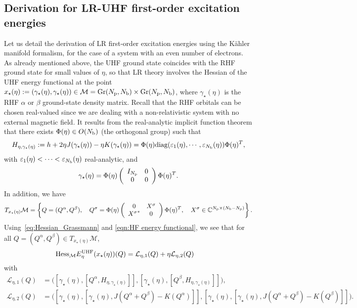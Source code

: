 \documentclass[11pt]{article}
\def\C{{\mathbb C}}
\begin{document}
\subsection{Derivation for LR-UHF first-order excitation energies}

Let us detail the derivation of LR first-order excitation energies using the K\"ahler manifold formalism, for the case of a system with an even number of electrons. As already mentioned above, the UHF ground state coincides with the RHF ground state for small values of $\eta$, so that LR theory involves the Hessian of the UHF energy functional at the point $x_\star(\eta):=(\gamma_\star(\eta),\gamma_\star(\eta)) \in \mathcal M={\rm Gr}(N_{\rm p},N_{\rm b}) \times {\rm Gr}(N_{\rm p},N_{\rm b})$, where $\gamma_\star(\eta)$ is the RHF $\alpha$ or $\beta$ ground-state density matrix. Recall that the RHF orbitals can be chosen real-valued since we are dealing with a non-relativistic system with no external magnetic field. It results from the real-analytic implicit function theorem that there exists $\Phi(\eta) \in  O(N_{\rm b})$ (the orthogonal group) such that 
$$
H_{\eta,\gamma_\star(\eta)} := h+2\eta J(\gamma_\star(\eta)) - \eta K(\gamma_\star(\eta)) = \Phi(\eta) \mbox{diag}(\varepsilon_1(\eta),\cdots,\varepsilon_{N_{\rm b}}(\eta)) \Phi(\eta)^T,
$$
with $\varepsilon_1(\eta) < \cdots < \varepsilon_{N_{\rm b}}(\eta)$ real-analytic, and
$$
\gamma_\star(\eta) = \Phi(\eta) \left( \begin{array}{cc} I_{N_{\rm p}} & 0 \\ 0 & 0 \end{array} \right) \Phi(\eta)^T.
$$
In addition, we have
$$
T_{x_\star(\eta)} \mathcal M = \left\{ Q=(Q^\alpha,Q^\beta), \quad Q^\sigma =   \Phi(\eta) \left( \begin{array}{cc} 0 & X^\sigma \\ {X^\sigma}^* & 0 \end{array} \right) \Phi(\eta)^T, \quad X^\sigma \in \C^{N_{\rm p} \times (N_{\rm b}-N_{\rm p})} \right\}.
$$
Using~\eqref{eq:Hessian_Grassmann} and \eqref{eqn:HF energy functional}, we see that for all $Q=(Q^\alpha,Q^\beta) \in T_{x_\star(\eta)} \mathcal M$,
\begin{align*}
{\rm Hess}_{\mathcal M} E^{\rm UHF}_\eta (x_\star(\eta)) (Q) &= {\mathcal L}_{\eta,1}(Q) + \eta {\mathcal L}_{\eta,2}(Q)
\end{align*}
with
\begin{align*}
{\mathcal L}_{\eta,1}(Q) &= \bigg( 
[ \gamma_\star(\eta),[Q^\alpha,H_{\eta,\gamma_\star(\eta)}]], [ \gamma_\star(\eta),[Q^\beta,H_{\eta,\gamma_\star(\eta)}]] \bigg), \\
{\mathcal L}_{\eta,2}(Q) &= \bigg( 
 [ \gamma_\star(\eta),[\gamma_\star(\eta),J(Q^\alpha+Q^\beta)-K(Q^\alpha)]],  [ \gamma_\star(\eta),[\gamma_\star(\eta),J(Q^\alpha+Q^\beta)-K(Q^\beta)]]
\bigg).
\end{align*}
\end{document}
